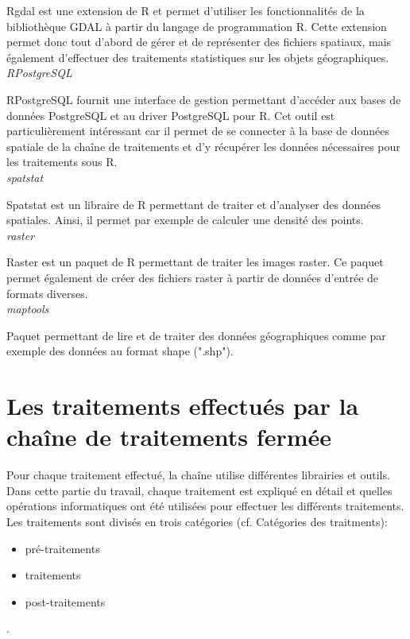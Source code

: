 Rgdal est une extension de R et permet d'utiliser les fonctionnalités de la bibliothèque GDAL à partir du langage de programmation R. Cette extension permet donc tout d'abord de gérer et de représenter des fichiers spatiaux, mais également d'effectuer des traitements statistiques sur les objets géographiques.\\

\textit{RPostgreSQL\\}

RPostgreSQL fournit une interface de gestion permettant d'accéder aux bases de données PostgreSQL et au driver PostgreSQL pour R. Cet outil est particulièrement intéressant car il permet de se connecter à la base de données spatiale de la chaîne de traitements et d'y récupérer les données nécessaires pour les traitements sous R.\\

\textit{spatstat\\}

Spatstat est un libraire de R permettant de traiter et d'analyser des données spatiales. Ainsi, il permet par exemple de calculer une densité des points.\\

\textit{raster\\}

Raster est un paquet de R permettant de traiter les images raster. Ce paquet permet également de créer des fichiers raster à partir de données d'entrée de formats diverses.\\

\textit{maptools\\}

Paquet permettant de lire et de traiter des données géographiques comme par exemple des données au format shape (".shp").


\newpage


\section{Les traitements effectués par la chaîne de traitements fermée}

Pour chaque traitement effectué, la chaîne utilise différentes librairies et outils. Dans cette partie du travail, chaque traitement est expliqué en détail et quelles opérations informatiques ont été utilisées pour effectuer les différents traitements. Les traitements sont divisés en trois catégories (cf. Catégories des traitments):\\ 
\begin{itemize}
\item pré-traitements 
\item traitements 
\item post-traitements

\end{itemize}. 


